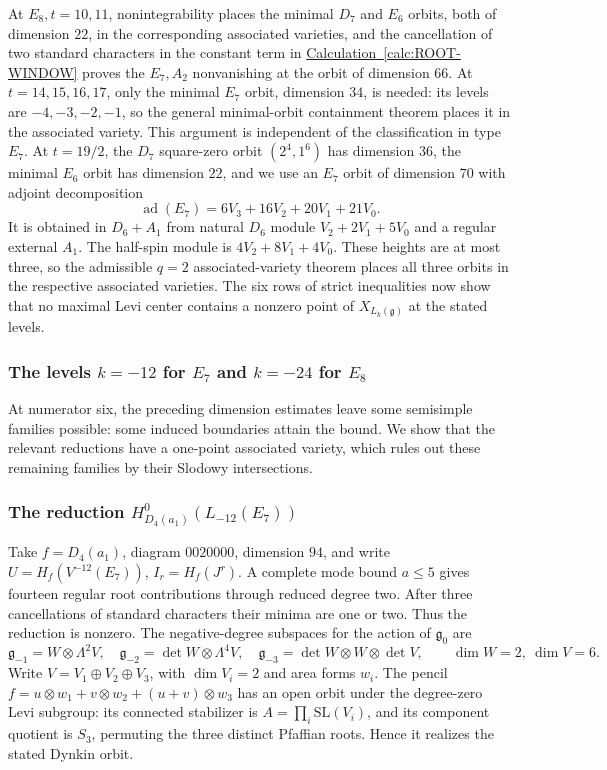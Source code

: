 \documentclass[11pt,a4paper]{amsart}
\numberwithin{equation}{section}
\theoremstyle{definition}
\theoremstyle{remark}
\newcommand{\g}{\mathfrak g}
\newcommand{\ad}{\operatorname{ad}}
\begin{document}
At $E_8,t=10,11$, nonintegrability places the minimal $D_7$ and
$E_6$ orbits, both of dimension $22$, in the corresponding associated varieties, and the cancellation of two standard characters in the constant term in \hyperref[calc:ROOT-WINDOW]{Calculation~\ref*{calc:ROOT-WINDOW}} proves the $E_7,A_2$
nonvanishing at the orbit of dimension $66$. At $t=14,15,16,17$, only the minimal
$E_7$ orbit, dimension $34$, is needed: its levels are $-4,-3,-2,-1$,
so the general minimal-orbit containment theorem
\cite[Proposition~4.7.2]{AAV} places it in the associated variety. This argument is independent of
the classification in type $E_7$. At $t=19/2$\label{exc:e8p19}, the $D_7$ square-zero orbit
$(2^4,1^6)$ has dimension $36$, the minimal $E_6$ orbit has dimension
$22$, and we use an $E_7$ orbit of dimension $70$ with adjoint decomposition
$$
 \ad(E_7)=6V_3+16V_2+20V_1+21V_0.
$$
It is obtained in $D_6+A_1$ from natural $D_6$ module
$V_2+2V_1+5V_0$ and a regular external $A_1$. The half-spin module is
$4V_2+8V_1+4V_0$. These heights are at most three, so the admissible
$q=2$ associated-variety theorem places all three orbits in the respective
associated varieties. The six rows of strict
inequalities now show that no maximal Levi center contains a nonzero
point of $X_{L_k(\g)}$ at the stated levels.

\subsubsection{The levels \texorpdfstring{$k=-12$ for $E_7$ and $k=-24$ for $E_8$}{k=-12 for E7 and k=-24 for E8}}
\label{vtwo:equivariant-exceptional}
At numerator six, the preceding dimension estimates leave some
semisimple families possible: some induced boundaries attain the bound. We show that
the relevant reductions have a one-point associated variety, which rules out
these remaining families by their Slodowy intersections.

\subsubsection{\texorpdfstring{The reduction $H^0_{D_4(a_1)}(L_{-12}(E_7))$}{The D4(a1) reduction of L-12(E7)}}
Take $f=D_4(a_1)$, diagram $0020000$, dimension $94$, and write
$U=H_f(V^{-12}(E_7))$, $I_r=H_f(J^r)$. A complete mode bound $a\le5$
gives fourteen regular root contributions through reduced degree two. After three
cancellations of standard characters their minima are one or two. Thus the
reduction is nonzero. The negative-degree subspaces for the action of $\g_0$ are
$$
 \g_{-1}=W\otimes\Lambda^2 V,\quad
 \g_{-2}=\det W\otimes\Lambda^4V,\quad
 \g_{-3}=\det W\otimes W\otimes\det V,
 \qquad \dim W=2,\ \dim V=6.
$$
Write $V=V_1\oplus V_2\oplus V_3$, with $\dim V_i=2$ and area forms
$w_i$. The pencil
$f=u\otimes w_1+v\otimes w_2+(u+v)\otimes w_3$ has an open
orbit under the degree-zero Levi subgroup: its connected stabilizer is
$A=\prod_i\mathrm{SL}(V_i)$, and its component quotient is $S_3$,
permuting the three distinct Pfaffian roots. Hence it realizes the
stated Dynkin orbit.
\end{document}
